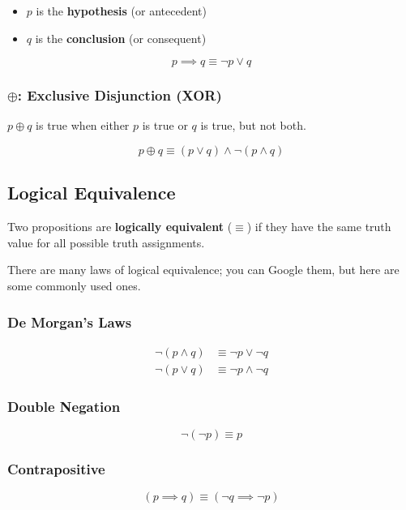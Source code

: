 \documentclass{report}
\begin{document}
\begin{itemize}
    \item $p$ is the \textbf{hypothesis} (or antecedent)
    \item $q$ is the \textbf{conclusion} (or consequent)
\end{itemize}

\begin{equation}
    p \implies q \equiv \lnot p \lor q
\end{equation}

\subsubsection{$\oplus$: Exclusive Disjunction (XOR)}

$p \oplus q$ is true when either $p$ is true or $q$ is true, but not both.

\begin{equation}
    p \oplus q \equiv (p \lor q) \land \lnot(p \land q)
\end{equation}

\subsection{Logical Equivalence}

Two propositions are \textbf{logically equivalent} ($\equiv$) if they have the same truth value for all possible truth assignments.

There are many laws of logical equivalence; you can Google them, but here are some commonly used ones.

\subsubsection{De Morgan's Laws}
\begin{align}
    \neg(p \land q) &\equiv \neg p \lor \neg q \\
    \neg(p \lor q) &\equiv \neg p \land \neg q
\end{align}

\subsubsection{Double Negation}
\begin{equation}
    \neg(\neg p) \equiv p
\end{equation}

\subsubsection{Contrapositive}
\begin{equation}
    (p \implies q) \equiv (\neg q \implies \neg p)
\end{equation}
\end{document}
